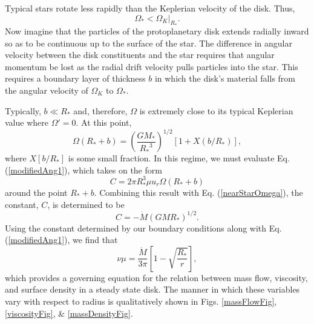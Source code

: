 \documentclass[aps,pra, twocolumn]{revtex4-1}
\begin{document}
Typical stars rotate less rapidly than the Keplerian velocity of the disk.  Thus,
\begin{equation}
\Omega_* < \Omega_K\bigg|_{R_*}. \nonumber
\end{equation}
Now imagine that the particles of the protoplanetary disk extends radially inward so as to be continuous up to the surface of the star.  The difference in angular velocity between the disk constituents and the star requires that angular momentum be lost as the radial drift velocity pulls particles into the star.  This requires a boundary layer of thickness $b$ in which the disk's material falls from the angular velocity of $\Omega_K$ to $\Omega_*$.  

Typically, $b \ll R_*$ and, therefore, $\Omega$ is extremely close to its typical Keplerian value where $\Omega' = 0$.  At this point,
\begin{equation}
\Omega(R_* + b) = \left(\frac{GM_*}{{R_*}^3} \right)^{1/2} \left[1 + X(b/R_*) \right], \label{nearStarOmega}
\end{equation}
where $X[b/R_*]$ is some small fraction.  In this regime, we must evaluate Eq. (\ref{modifiedAng1}), which takes on the form
\begin{equation}
C = 2\pi R_*^3 \mu u_r \Omega(R_* + b) \nonumber
\end{equation}
around the point $R_* + b$.  Combining this result with Eq. (\ref{nearStarOmega}), the constant, $C$,  is determined to be
\begin{equation}
C = - \dot{M}(G M R_*)^{1/2}. \nonumber
\end{equation}
Using the constant determined by our boundary conditions along with Eq. (\ref{modifiedAng1}), we find that
\begin{equation}
\nu \mu = \frac{\dot{M}}{3\pi}\left[ 1 - \sqrt{\frac{R_*}{r}} \right], \label{massFlow}
\end{equation}
which provides a governing equation for the relation between mass flow, viscosity, and surface density in a steady state disk.  The manner in which these variables vary with respect to radius is qualitatively shown in Figs. \ref{massFlowFig}, \ref{viscosityFig}, \& \ref{massDensityFig}.
\end{document}

